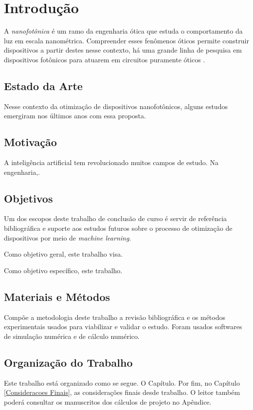 \chapter{Introdução}      \label{Introducao}

A \textit{nanofotônica} é um ramo da engenharia ótica que estuda o comportamento da luz em escala nanométrica. Compreender esses fenômenos óticos permite construir dispositivos a partir destes nesse contexto, há uma grande linha de pesquisa em dispositivos fotônicos para atuarem em circuitos puramente óticos \cite{luizheinrich2021}.


\section{Estado da Arte}

Nesse contexto da otimização de dispositivos nanofotônicos, alguns estudos emergiram nos últimos anos com essa proposta.


\section{Motivação}

A inteligência artificial tem revolucionado muitos campos de estudo. Na engenharia,.


\section{Objetivos}

Um dos escopos deste trabalho de conclusão de curso é servir de referência bibliográfica e suporte aos estudos futuros sobre o processo de otimização de dispositivos por meio de \textit{machine learning}.

Como objetivo geral, este trabalho visa.

Como objetivo específico, este trabalho.


\section{Materiais e Métodos}

Compõe a metodologia deste trabalho a revisão bibliográfica e os métodos experimentais usados para viabilizar e validar o estudo. Foram usados softwares de simulação numérica e de cálculo numérico. 


\section{Organização do Trabalho}

Este trabalho está organizado como se segue. O Capítulo. Por fim, no Capítulo \ref{Consideracoes Finais}, as considerações finais desde trabalho. O leitor também poderá consultar os manuscritos dos cálculos de projeto no Apêndice.